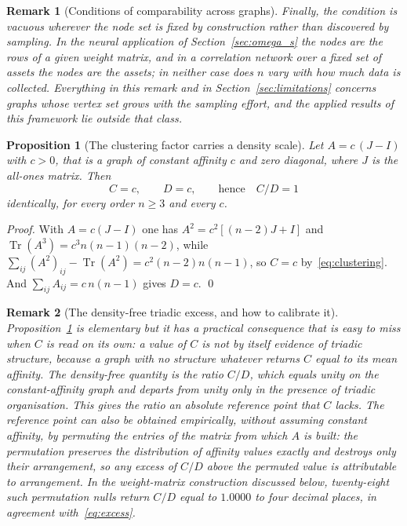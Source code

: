\documentclass[11pt,a4paper]{article}
\newtheorem{proposition}{Proposition}
\newtheorem{remark}{Remark}
\begin{document}
\begin{remark}[Conditions of comparability across graphs]
Finally, the condition is \emph{vacuous} wherever the node set is fixed by
construction rather than discovered by sampling. In the neural application of
Section~\ref{sec:omega_s} the nodes are the rows of a given weight matrix, and
in a correlation network over a fixed set of assets the nodes are the assets;
in neither case does $n$ vary with how much data is collected. Everything in
this remark and in Section~\ref{sec:limitations} concerns graphs whose vertex
set grows with the sampling effort, and the applied results of this framework
lie outside that class.
\end{remark}

\begin{proposition}[The clustering factor carries a density scale]
\label{prop:excess}
Let $A = c\,(J - I)$ with $c > 0$, that is a graph of constant affinity $c$
and zero diagonal, where $J$ is the all-ones matrix. Then
\begin{equation}
C = c, \qquad D = c, \qquad \text{hence} \quad C/D = 1
\label{eq:excess}
\end{equation}
identically, for every order $n \ge 3$ and every $c$.
\end{proposition}

\begin{proof}
With $A = c(J-I)$ one has $A^2 = c^2[(n-2)J + I]$ and
$\operatorname{Tr}(A^3) = c^3 n(n-1)(n-2)$, while
$\sum_{ij}(A^2)_{ij} - \operatorname{Tr}(A^2) = c^2 (n-2)n(n-1)$, so
$C = c$ by~\eqref{eq:clustering}. And $\sum_{ij} A_{ij} = c\,n(n-1)$ gives
$D = c$. \qed
\end{proof}

\begin{remark}[The density-free triadic excess, and how to calibrate it]
\label{rem:excess}
Proposition~\ref{prop:excess} is elementary but it has a practical
consequence that is easy to miss when $C$ is read on its own: a value of $C$
is not by itself evidence of triadic structure, because a graph with no
structure whatever returns $C$ equal to its mean affinity. The
density-free quantity is the ratio $C/D$, which equals unity on the
constant-affinity graph and departs from unity only in the presence of
triadic organisation. This gives the ratio an absolute reference point that
$C$ lacks.
The reference point can also be obtained empirically, without assuming
constant affinity, by permuting the entries of the matrix from which $A$ is
built: the permutation preserves the distribution of affinity values exactly
and destroys only their arrangement, so any excess of $C/D$ above the
permuted value is attributable to arrangement. In the weight-matrix
construction discussed below, twenty-eight such permutation nulls return
$C/D$ equal to $1.0000$ to four decimal places, in agreement
with~\eqref{eq:excess}.
\end{remark}
\end{document}
